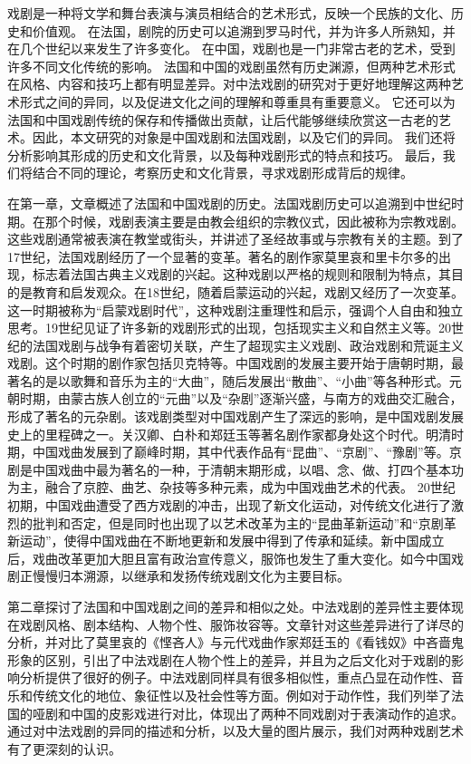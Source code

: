 \documentclass[UTF8,a4paper,12pt]{ctexart}
\numberwithin{equation}{section}
\begin{document}
\hspace{8mm}
\songti 戏剧是一种将文学和舞台表演与演员相结合的艺术形式，反映一个民族的文化、历史和价值观。 在法国，剧院的历史可以追溯到罗马时代，并为许多人所熟知，并在几个世纪以来发生了许多变化。 在中国，戏剧也是一门非常古老的艺术，受到许多不同文化传统的影响。 法国和中国的戏剧虽然有历史渊源，但两种艺术形式在风格、内容和技巧上都有明显差异。对中法戏剧的研究对于更好地理解这两种艺术形式之间的异同，以及促进文化之间的理解和尊重具有重要意义。 它还可以为法国和中国戏剧传统的保存和传播做出贡献，让后代能够继续欣赏这一古老的艺术。因此，本文研究的对象是中国戏剧和法国戏剧，以及它们的异同。 我们还将分析影响其形成的历史和文化背景，以及每种戏剧形式的特点和技巧。 最后，我们将结合不同的理论，考察历史和文化背景，寻求戏剧形成背后的规律。

在第一章，文章概述了法国和中国戏剧的历史。法国戏剧历史可以追溯到中世纪时期。在那个时候，戏剧表演主要是由教会组织的宗教仪式，因此被称为宗教戏剧。这些戏剧通常被表演在教堂或街头，并讲述了圣经故事或与宗教有关的主题。到了17世纪，法国戏剧经历了一个显著的变革。著名的剧作家莫里哀和里卡尔多的出现，标志着法国古典主义戏剧的兴起。这种戏剧以严格的规则和限制为特点，其目的是教育和启发观众。在18世纪，随着启蒙运动的兴起，戏剧又经历了一次变革。这一时期被称为“启蒙戏剧时代”，这种戏剧注重理性和启示，强调个人自由和独立思考。19世纪见证了许多新的戏剧形式的出现，包括现实主义和自然主义等。20世纪的法国戏剧与战争有着密切关联，产生了超现实主义戏剧、政治戏剧和荒诞主义戏剧。这个时期的剧作家包括贝克特等。中国戏剧的发展主要开始于唐朝时期，最著名的是以歌舞和音乐为主的“大曲”，随后发展出“散曲”、“小曲”等各种形式。元朝时期，由蒙古族人创立的“元曲”以及“杂剧”逐渐兴盛，与南方的戏曲交汇融合，形成了著名的元杂剧。该戏剧类型对中国戏剧产生了深远的影响，是中国戏剧发展史上的里程碑之一。关汉卿、白朴和郑廷玉等著名剧作家都身处这个时代。明清时期，中国戏曲发展到了巅峰时期，其中代表作品有“昆曲”、“京剧”、“豫剧”等。京剧是中国戏曲中最为著名的一种，于清朝末期形成，以唱、念、做、打四个基本功为主，融合了京腔、曲艺、杂技等多种元素，成为中国戏曲艺术的代表。
20世纪初期，中国戏曲遭受了西方戏剧的冲击，出现了新文化运动，对传统文化进行了激烈的批判和否定，但是同时也出现了以艺术改革为主的“昆曲革新运动”和“京剧革新运动”，使得中国戏曲在不断地更新和发展中得到了传承和延续。新中国成立后，戏曲改革更加大胆且富有政治宣传意义，服饰也发生了重大变化。如今中国戏剧正慢慢归本溯源，以继承和发扬传统戏剧文化为主要目标。

第二章探讨了法国和中国戏剧之间的差异和相似之处。中法戏剧的差异性主要体现在戏剧风格、剧本结构、人物个性、服饰妆容等。文章针对这些差异进行了详尽的分析，并对比了莫里哀的《悭吝人》与元代戏曲作家郑廷玉的《看钱奴》中吝啬鬼形象的区别，引出了中法戏剧在人物个性上的差异，并且为之后文化对于戏剧的影响分析提供了很好的例子。中法戏剧同样具有很多相似性，重点凸显在动作性、音乐和传统文化的地位、象征性以及社会性等方面。例如对于动作性，我们列举了法国的哑剧和中国的皮影戏进行对比，体现出了两种不同戏剧对于表演动作的追求。通过对中法戏剧的异同的描述和分析，以及大量的图片展示，我们对两种戏剧艺术有了更深刻的认识。
\end{document}
